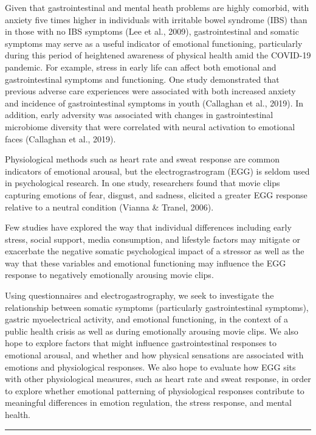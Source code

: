 \documentclass[]{book}
\begin{document}
Given that gastrointestinal and mental heath problems are highly comorbid, with anxiety five times higher in individuals with irritable bowel syndrome (IBS) than in those with no IBS symptoms (Lee et al., 2009), gastrointestinal and somatic symptoms may serve as a useful indicator of emotional functioning, particularly during this period of heightened awareness of physical health amid the COVID-19 pandemic. For example, stress in early life can affect both emotional and gastrointestinal symptoms and functioning. One study demonstrated that previous adverse care experiences were associated with both increased anxiety and incidence of gastrointestinal symptoms in youth (Callaghan et al., 2019). In addition, early adversity was associated with changes in gastrointestinal microbiome diversity that were correlated with neural activation to emotional faces (Callaghan et al., 2019).

Physiological methods such as heart rate and sweat response are common indicators of emotional arousal, but the electrograstrogram (EGG) is seldom used in psychological research. In one study, researchers found that movie clips capturing emotions of fear, disgust, and sadness, elicited a greater EGG response relative to a neutral condition (Vianna \& Tranel, 2006).

Few studies have explored the way that individual differences including early stress, social support, media consumption, and lifestyle factors may mitigate or exacerbate the negative somatic psychological impact of a stressor as well as the way that these variables and emotional functioning may influence the EGG response to negatively emotionally arousing movie clips.

Using questionnaires and electrogastrography, we seek to investigate the relationship between somatic symptoms (particularly gastrointestinal symptoms), gastric myoelectrical activity, and emotional functioning, in the context of a public health crisis as well as during emotionally arousing movie clips. We also hope to explore factors that might influence gastrointestinal responses to emotional arousal, and whether and how physical sensations are associated with emotions and physiological responses. We also hope to evaluate how EGG sits with other physiological measures, such as heart rate and sweat response, in order to explore whether emotional patterning of physiological responses contribute to meaningful differences in emotion regulation, the stress response, and mental health.

\begin{center}\rule{0.5\linewidth}{0.5pt}\end{center}
\end{document}
